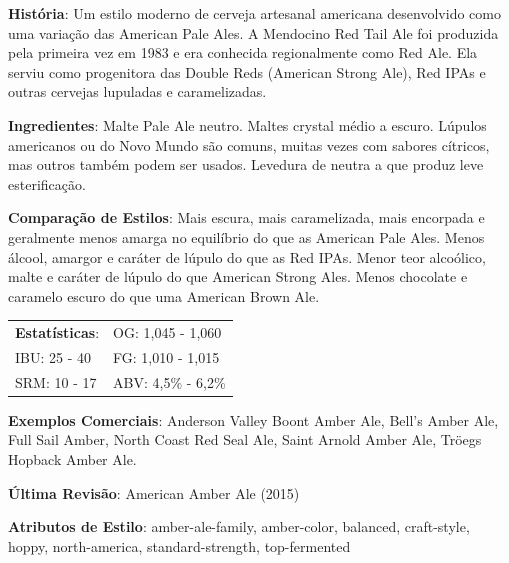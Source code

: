 \textbf{História}: Um estilo moderno de cerveja artesanal americana desenvolvido como uma variação das American Pale Ales. A Mendocino Red Tail Ale foi produzida pela primeira vez em 1983 e era conhecida regionalmente como Red Ale. Ela serviu como progenitora das Double Reds (American Strong Ale), Red IPAs e outras cervejas lupuladas e caramelizadas.

\textbf{Ingredientes}: Malte Pale Ale neutro. Maltes crystal médio a escuro. Lúpulos americanos ou do Novo Mundo são comuns, muitas vezes com sabores cítricos, mas outros também podem ser usados. Levedura de neutra a que produz leve esterificação.

\textbf{Comparação de Estilos}: Mais escura, mais caramelizada, mais encorpada e geralmente menos amarga no equilíbrio do que as American Pale Ales. Menos álcool, amargor e caráter de lúpulo do que as Red IPAs. Menor teor alcoólico, malte e caráter de lúpulo do que American Strong Ales. Menos chocolate e caramelo escuro do que uma American Brown Ale.

\begin{tabular}{@{}p{35mm}p{35mm}@{}}
  \textbf{Estatísticas}: & OG: 1,045 - 1,060 \\
  IBU: 25 - 40  & FG: 1,010 - 1,015  \\
  SRM: 10 - 17  & ABV: 4,5\% - 6,2\%
\end{tabular}

\textbf{Exemplos Comerciais}: Anderson Valley Boont Amber Ale, Bell’s Amber Ale, Full Sail Amber, North Coast Red Seal Ale, Saint Arnold Amber Ale, Tröegs Hopback Amber Ale.

\textbf{Última Revisão}: American Amber Ale (2015)

\textbf{Atributos de Estilo}: amber-ale-family, amber-color, balanced, craft-style, hoppy, north-america, standard-strength, top-fermented

